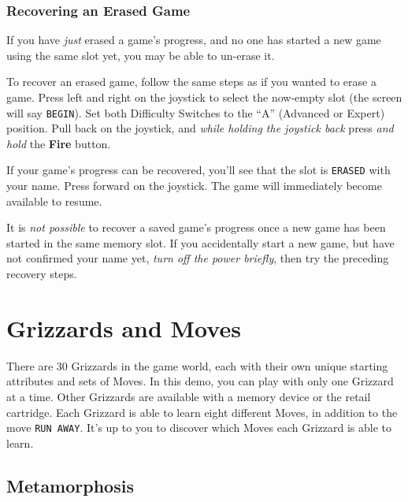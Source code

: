 \documentclass[9pt,twocolumn,openany,article,crop]{memoir}
\begin{document}
\ifdefined\DEMO\else

\subsection{Recovering an Erased Game}

If you have \emph{just} erased a game's progress, and no one has started
a new game using the same slot yet, you may be able to un-erase it.

To recover  an erased game,  follow the same steps  as if you  wanted to
erase  a game.  Press  left and  right  on the  joystick  to select  the
now-empty slot (the screen will say \texttt{BEGIN}). Set both Difficulty
Switches to  the ``A'' (Advanced or  Expert) position. Pull back  on the
joystick,  and \emph{while  holding the  joystick back}  press \emph{and
  hold} the \textbf{Fire} button.

If your  game's progress can be  recovered, you'll see that  the slot is
\texttt{ERASED} with your name. Press  forward on the joystick. The game
will immediately become available to resume.

It is \emph{not possible} to recover  a saved game's progress once a new
game has been started in the same memory slot. If you accidentally start
a new  game, but have  not confirmed your  name yet, \emph{turn  off the
  power briefly}, then try the preceding recovery steps.

\fi

\fi %

\ifdefined\ATARIAGESAVE\pagebreak\fi

\chapter{Grizzards and Moves}\label{ch:Grizzards}

There are  30 Grizzards in  the game world,  each with their  own unique
starting attributes and  sets of Moves. \ifdefined\NOSAVE  In this demo,
you  can play  with only  one Grizzard  at a  time. Other  Grizzards are
available  with  a memory  device  or  the  retail cartridge.  \fi  Each
Grizzard is able to learn eight different Moves, in addition to the move
\texttt{RUN AWAY}. It's up to you  to discover which Moves each Grizzard
is able to learn.

\section{Metamorphosis}
\end{document}
